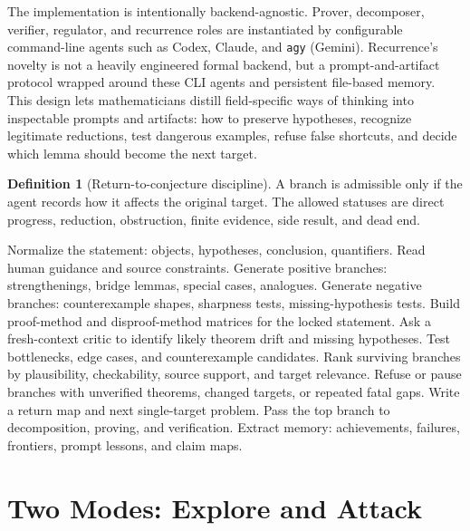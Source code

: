 \documentclass{article}
\theoremstyle{definition}
\newtheorem{definition}{Definition}
\theoremstyle{remark}
\begin{document}
The implementation is intentionally backend-agnostic. Prover, decomposer, verifier, regulator, and recurrence roles are instantiated by configurable command-line agents such as Codex, Claude, and \texttt{agy} (Gemini). Recurrence's novelty is not a heavily engineered formal backend, but a prompt-and-artifact protocol wrapped around these CLI agents and persistent file-based memory. This design lets mathematicians distill field-specific ways of thinking into inspectable prompts and artifacts: how to preserve hypotheses, recognize legitimate reductions, test dangerous examples, refuse false shortcuts, and decide which lemma should become the next target.

\begin{definition}[Return-to-conjecture discipline]
A branch is admissible only if the agent records how it affects the original target. The allowed statuses are direct progress, reduction, obstruction, finite evidence, side result, and dead end.
\end{definition}

\begin{algorithm}[t]
  \caption{Recurrence loop for one target}
  \label{alg:recurrence}
  \begin{algorithmic}[1]
    \STATE Normalize the statement: objects, hypotheses, conclusion, quantifiers.
    \STATE Read human guidance and source constraints.
      \STATE Generate positive branches: strengthenings, bridge lemmas, special cases, analogues.
      \STATE Generate negative branches: counterexample shapes, sharpness tests, missing-hypothesis tests.
    \ELSE
      \STATE Build proof-method and disproof-method matrices for the locked statement.
      \STATE Ask a fresh-context critic to identify likely theorem drift and missing hypotheses.
      \STATE Test bottlenecks, edge cases, and counterexample candidates.
    \ENDIF
    \STATE Rank surviving branches by plausibility, checkability, source support, and target relevance.
    \STATE Refuse or pause branches with unverified theorems, changed targets, or repeated fatal gaps.
    \STATE Write a return map and next single-target problem.
    \STATE Pass the top branch to decomposition, proving, and verification.
    \STATE Extract memory: achievements, failures, frontiers, prompt lessons, and claim maps.
  \end{algorithmic}
\end{algorithm}

\section{Two Modes: Explore and Attack}
\end{document}
